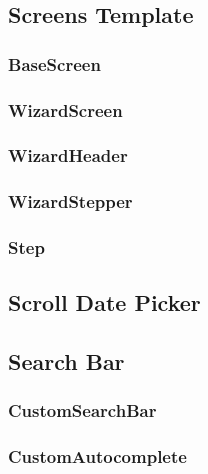 \subsection{Screens Template}
\label{subsec:screens-template}

\subsubsection*{BaseScreen}
\label{subsubsec:base-screen}

\subsubsection*{WizardScreen}
\label{subsubsec:wizard-screen}

\subsubsection*{WizardHeader}
\label{subsubsec:wizard-header}

\subsubsection*{WizardStepper}
\label{subsubsec:wizard-stepper}

\subsubsection*{Step}
\label{subsubsec:step}

\subsection{Scroll Date Picker}
\label{subsec:scroll-date-picker}

\subsection{Search Bar}
\label{subsec:search-bar}

\subsubsection*{CustomSearchBar}
\label{subsubsec:custom-search-bar}

\subsubsection*{CustomAutocomplete}
\label{subsubsec:custom-autocomplete}

